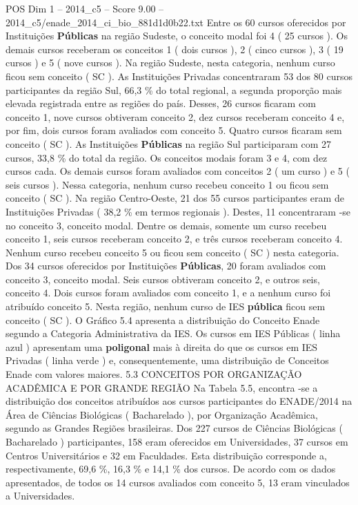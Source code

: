 \begin{textsample}{POS Dim 1 – 2014\_c5 – Score 9.00 – 2014\_c5/enade\_2014\_ci\_bio\_881d1d0b22.txt}
Entre os 60 cursos oferecidos por Instituições \textbf{Públicas} na região Sudeste, o conceito modal foi 4 ( 25 cursos ).
Os demais cursos receberam os conceitos 1 ( dois cursos ), 2 ( cinco cursos ), 3 ( 19 cursos ) e 5 ( nove cursos ).
Na região Sudeste, nesta categoria, nenhum curso ficou sem conceito ( SC ).
As Instituições Privadas concentraram 53 dos 80 cursos participantes da região Sul, 66,3 \% do total regional, a segunda proporção mais elevada registrada entre as regiões do país.
Desses, 26 cursos ficaram com conceito 1, nove cursos obtiveram conceito 2, dez cursos receberam conceito 4 e, por fim, dois cursos foram avaliados com conceito 5.
Quatro cursos ficaram sem conceito ( SC ).
As Instituições \textbf{Públicas} na região Sul participaram com 27 cursos, 33,8 \% do total da região.
Os conceitos modais foram 3 e 4, com dez cursos cada.
Os demais cursos foram avaliados com conceitos 2 ( um curso ) e 5 ( seis cursos ).
Nessa categoria, nenhum curso recebeu conceito 1 ou ficou sem conceito ( SC ).
Na região Centro-Oeste, 21 dos 55 cursos participantes eram de Instituições Privadas ( 38,2 \% em termos regionais ).
Destes, 11 concentraram -se no conceito 3, conceito modal.
Dentre os demais, somente um curso recebeu conceito 1, seis cursos receberam conceito 2, e três cursos receberam conceito 4.
Nenhum curso recebeu conceito 5 ou ficou sem conceito ( SC ) nesta categoria.
Dos 34 cursos oferecidos por Instituições \textbf{Públicas}, 20 foram avaliados com conceito 3, conceito modal.
Seis cursos obtiveram conceito 2, e outros seis, conceito 4.
Dois cursos foram avaliados com conceito 1, e a nenhum curso foi atribuído conceito 5.
Nesta região, nenhum curso de IES \textbf{pública} ficou sem conceito ( SC ).
O Gráfico 5.4 apresenta a distribuição do Conceito Enade segundo a Categoria Administrativa da IES.
Os cursos em IES Públicas ( linha azul ) apresentam uma \textbf{poligonal} mais à direita do que os cursos em IES Privadas ( linha verde ) e, consequentemente, uma distribuição de Conceitos Enade com valores maiores. 5.3 CONCEITOS POR ORGANIZAÇÃO ACADÊMICA E POR GRANDE REGIÃO Na Tabela 5.5, encontra -se a distribuição dos conceitos atribuídos aos cursos participantes do ENADE/2014 na Área de Ciências Biológicas ( Bacharelado ), por Organização Acadêmica, segundo as Grandes Regiões brasileiras.
Dos 227 cursos de Ciências Biológicas ( Bacharelado ) participantes, 158 eram oferecidos em Universidades, 37 cursos em Centros Universitários e 32 em Faculdades.
Esta distribuição corresponde a, respectivamente, 69,6 \%, 16,3 \% e 14,1 \% dos cursos.
De acordo com os dados apresentados, de todos os 14 cursos avaliados com conceito 5, 13 eram vinculados a Universidades.

\end{textsample}
